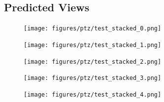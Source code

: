 \begin{appendices}
\section{Predicted Views} \label{sec:app-predictions-pred}
\begin{figure}[H]
    \centering
    \texttt{[image: figures/ptz/test\_stacked\_0.png]}
\end{figure}
\begin{figure}[H]
    \centering
    \texttt{[image: figures/ptz/test\_stacked\_1.png]}
\end{figure}
\begin{figure}[H]
    \centering
    \texttt{[image: figures/ptz/test\_stacked\_2.png]}
\end{figure}
\begin{figure}[H]
    \centering
    \texttt{[image: figures/ptz/test\_stacked\_3.png]}
\end{figure}
\begin{figure}[H]
    \centering
    \texttt{[image: figures/ptz/test\_stacked\_4.png]}
\end{figure}

\end{appendices}